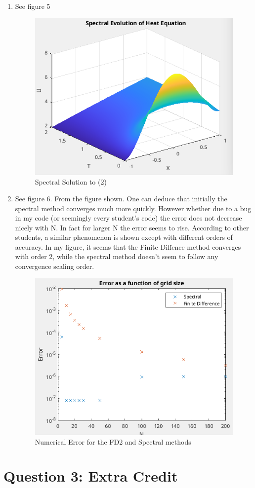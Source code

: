 \documentclass{article}
\begin{document}
\begin{enumerate}[label=\alph*)]
    \item See figure 5
    \begin{figure}[ht]
        \centering
        \includegraphics[width=.5\textwidth]{q2_gcl_sol.png}
        \caption{Spectral Solution to (2)}
    \end{figure}

    \item See figure 6. From the figure shown. One can deduce that initially the
    spectral method converges much more quickly. However whether due to a bug in
    my code (or seemingly every student's code) the error does not decrease
    nicely with N. In fact for larger N the error seems to rise. According to
    other students, a similar phenomenon is shown except with different orders
    of accuracy. In my figure, it seems that the Finite Diffence method
    converges with order 2, while the spectral method doesn't seem to follow any
    convergence scaling order. 
    \begin{figure}[ht]
        \centering
        \includegraphics[width=.5\textwidth]{q2_error.png}
        \caption{Numerical Error for the FD2 and Spectral methods}
    \end{figure}

\end{enumerate}

\section*{Question 3: Extra Credit}
\end{document}
